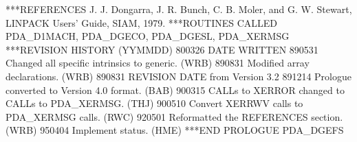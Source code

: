 \documentclass[11pt,twoside,nolof]{starlink}
\begin{document}
\begin{terminalv}
***REFERENCES  J. J. Dongarra, J. R. Bunch, C. B. Moler, and G. W.
                 Stewart, LINPACK Users' Guide, SIAM, 1979.
***ROUTINES CALLED  PDA_D1MACH, PDA_DGECO, PDA_DGESL, PDA_XERMSG
***REVISION HISTORY  (YYMMDD)
   800326  DATE WRITTEN
   890531  Changed all specific intrinsics to generic.  (WRB)
   890831  Modified array declarations.  (WRB)
   890831  REVISION DATE from Version 3.2
   891214  Prologue converted to Version 4.0 format.  (BAB)
   900315  CALLs to XERROR changed to CALLs to PDA_XERMSG.  (THJ)
   900510  Convert XERRWV calls to PDA_XERMSG calls.  (RWC)
   920501  Reformatted the REFERENCES section.  (WRB)
   950404  Implement status.  (HME)
***END PROLOGUE  PDA_DGEFS
\end{terminalv}








\end{document}
